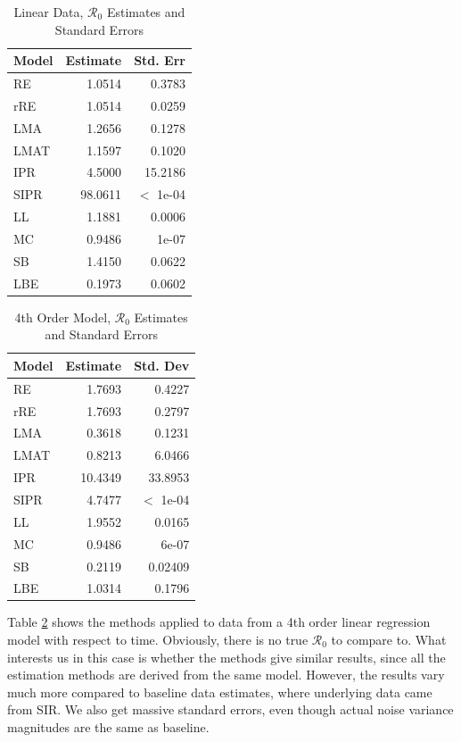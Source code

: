 \documentclass[12pt]{article}
\newcommand{\rr}{\ensuremath{\mathcal{R}_0}}
\begin{document}
\begin{table}[H]

	\centering
	\begin{tabular}[t]{l|r|r}
		\hline
		Model & Estimate & Std. Err\\
		\hline
		RE & 1.0514 & 0.3783\\
		\hline
		rRE & 1.0514 & 0.0259\\
		\hline
		LMA & 1.2656 & 0.1278\\
		\hline
		LMAT & 1.1597 & 0.1020\\
		\hline
		IPR & 4.5000 & 15.2186\\
		\hline
		SIPR & 98.0611 & $<$ 1e-04\\
		\hline
		LL & 1.1881 & 0.0006\\
		\hline
		MC & 0.9486 & 1e-07 \\
		\hline
		SB & 1.4150 & 0.0622\\
		\hline
		LBE & 0.1973 & 0.0602\\
		\hline
	\end{tabular}
	\caption{Linear Data, $\rr$ Estimates and Standard Errors}\label{tab:other-res1}
\end{table}

\begin{table}[H]


\centering
\begin{tabular}[t]{l|r|r}
	\hline
	Model & Estimate & Std. Dev\\
	\hline
	RE & 1.7693 & 0.4227\\
	\hline
	rRE & 1.7693 & 0.2797\\
	\hline
	LMA & 0.3618 & 0.1231\\
	\hline
	LMAT & 0.8213 & 6.0466\\
	\hline
	IPR & 10.4349 & 33.8953 \\
	\hline
	SIPR & 4.7477 &  $<$ 1e-04\\
	\hline
	LL & 1.9552 & 0.0165\\
	\hline
	MC & 0.9486 & 6e-07\\
	\hline
	SB & 0.2119 & 0.02409\\
	\hline
	LBE & 1.0314 & 0.1796\\
	\hline
\end{tabular}
\caption{4th Order Model, $\rr$ Estimates and Standard Errors}\label{tab:other-res2} 
\end{table}

Table \ref{tab:other-res2} shows the methods applied to data from a 4th order linear regression model with respect to time. Obviously, there is no true $\rr$ to compare to. What interests us in this case is whether the methods give similar results, since all the estimation methods are derived from the same model. However, the results vary much more compared to baseline data estimates, where underlying data came from SIR. We also get massive standard errors, even though actual noise variance magnitudes are the same as baseline.
\end{document}
